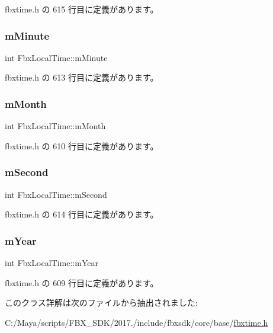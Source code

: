  fbxtime.\+h の 615 行目に定義があります。

\mbox{\label{class_fbx_local_time_afe3483e57271409b93ab1523a4b02c53}} 
\subsubsection{\texorpdfstring{m\+Minute}{mMinute}}
{\footnotesize\ttfamily int Fbx\+Local\+Time\+::m\+Minute}



 fbxtime.\+h の 613 行目に定義があります。

\mbox{\label{class_fbx_local_time_ab952f33eb09aaace10187d943f16331e}} 
\subsubsection{\texorpdfstring{m\+Month}{mMonth}}
{\footnotesize\ttfamily int Fbx\+Local\+Time\+::m\+Month}



 fbxtime.\+h の 610 行目に定義があります。

\mbox{\label{class_fbx_local_time_a5ebbe9a0fb42e63790c1bb2d4844b86c}} 
\subsubsection{\texorpdfstring{m\+Second}{mSecond}}
{\footnotesize\ttfamily int Fbx\+Local\+Time\+::m\+Second}



 fbxtime.\+h の 614 行目に定義があります。

\mbox{\label{class_fbx_local_time_a824c8b3c8dcab952b4e75436e696c519}} 
\subsubsection{\texorpdfstring{m\+Year}{mYear}}
{\footnotesize\ttfamily int Fbx\+Local\+Time\+::m\+Year}



 fbxtime.\+h の 609 行目に定義があります。



このクラス詳解は次のファイルから抽出されました\+:\begin{DoxyCompactItemize}
\item 
C\+:/\+Maya/scripts/\+F\+B\+X\+\_\+\+S\+D\+K/2017./include/fbxsdk/core/base/\hyperlink{fbxtime_8h}{fbxtime.\+h}\end{DoxyCompactItemize}
